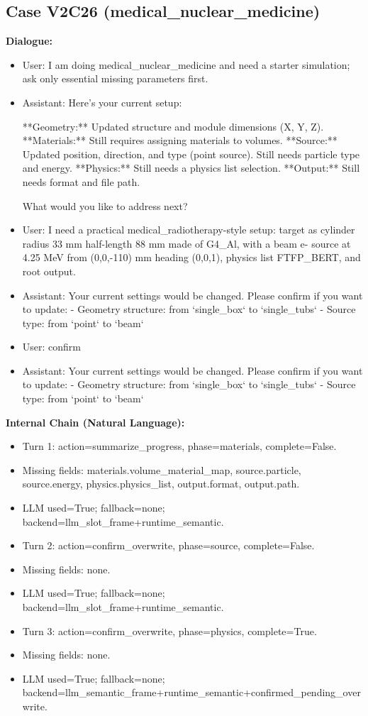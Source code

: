 \documentclass[11pt]{ctexart}
\begin{document}
\subsection{Case V2C26 (medical\_nuclear\_medicine)}
\textbf{Dialogue:}
\begin{itemize}
\item User: I am doing medical\_nuclear\_medicine and need a starter simulation; ask only essential missing parameters first.
\item Assistant: Here's your current setup:

**Geometry:** Updated structure and module dimensions (X, Y, Z).
**Materials:** Still requires assigning materials to volumes.
**Source:** Updated position, direction, and type (point source). Still needs particle type and energy.
**Physics:** Still needs a physics list selection.
**Output:** Still needs format and file path.

What would you like to address next?
\item User: I need a practical medical\_radiotherapy-style setup: target as cylinder radius 33 mm half-length 88 mm made of G4\_Al, with a beam e- source at 4.25 MeV from (0,0,-110) mm heading (0,0,1), physics list FTFP\_BERT, and root output.
\item Assistant: Your current settings would be changed. Please confirm if you want to update:
- Geometry structure: from `single\_box` to `single\_tubs`
- Source type: from `point` to `beam`
\item User: confirm
\item Assistant: Your current settings would be changed. Please confirm if you want to update:
- Geometry structure: from `single\_box` to `single\_tubs`
- Source type: from `point` to `beam`
\end{itemize}
\textbf{Internal Chain (Natural Language):}
\begin{itemize}
\item Turn 1: action=summarize\_progress, phase=materials, complete=False.
\item Missing fields: materials.volume\_material\_map, source.particle, source.energy, physics.physics\_list, output.format, output.path.
\item LLM used=True; fallback=none; backend=llm\_slot\_frame+runtime\_semantic.
\item Turn 2: action=confirm\_overwrite, phase=source, complete=False.
\item Missing fields: none.
\item LLM used=True; fallback=none; backend=llm\_slot\_frame+runtime\_semantic.
\item Turn 3: action=confirm\_overwrite, phase=physics, complete=True.
\item Missing fields: none.
\item LLM used=True; fallback=none; backend=llm\_semantic\_frame+runtime\_semantic+confirmed\_pending\_overwrite.
\end{itemize}
\end{document}

